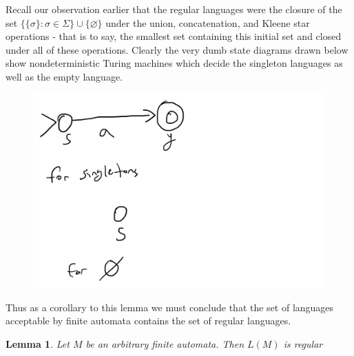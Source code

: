\documentclass{article}
\theoremstyle{definition}
\theoremstyle{plain}
\theoremstyle{theorem}
\newtheorem{lemma}{Lemma}[section]
\begin{document}
Recall our observation earlier that the regular languages were the closure of the set $\{\{\sigma \}: \sigma \in \Sigma\} \cup \{\varnothing \}$ under the union, concatenation, and Kleene star operations - that is to say, the smallest set containing this initial set and closed under all of these operations. Clearly the very dumb state diagrams drawn below show nondeterministic Turing machines which decide the singleton languages as well as the empty language.
\begin{figure}[H]
	\centering
  \includegraphics[width=0.4\linewidth]{dumb.png}
  \label{fig:test1}
\end{figure}
Thus as a corollary to this lemma we must conclude that the set of languages acceptable by finite automata contains the set of regular languages. 
\begin{lemma}
	Let $M$ be an arbitrary finite automata. Then $L(M)$ is regular
\end{lemma}
\end{document}
